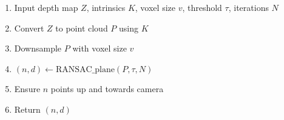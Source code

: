 \begin{enumerate}
    \item Input depth map $Z$, intrinsics $K$, voxel size $v$, threshold $\tau$, iterations $N$
    \item Convert $Z$ to point cloud $P$ using $K$
    \item Downsample $P$ with voxel size $v$
    \item $(n,d) \gets \text{RANSAC\_plane}(P,\tau,N)$
    \item Ensure $n$ points up and towards camera
    \item Return $(n,d)$
\end{enumerate}
